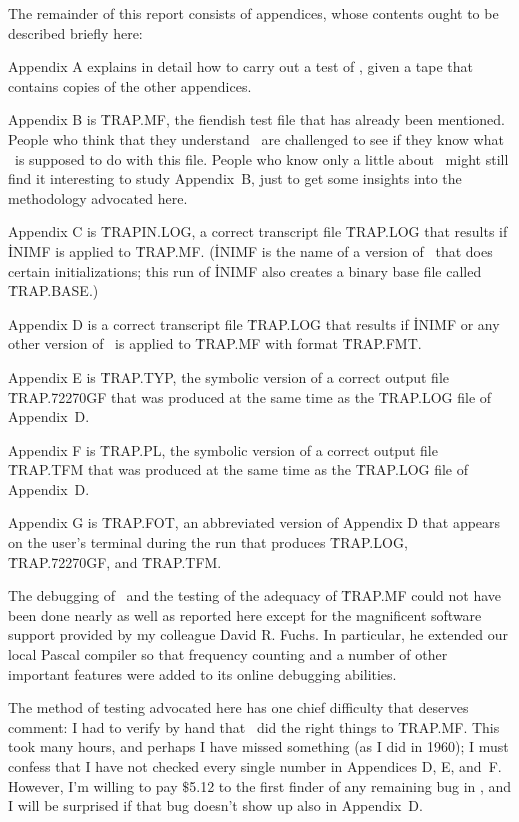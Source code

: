 The remainder of this report consists of appendices, whose contents ought
to be described briefly here:

Appendix A explains in detail how to carry out a test of \MF, given
a tape that contains copies of the other appendices.

Appendix B is \.{TRAP.MF}, the fiendish test file that has already
been mentioned. People who think that they understand \MF\ are challenged
to see if they know what \MF\ is supposed to do with this file.
People who know only a little about \MF\ might still find it
interesting to study Appendix~B, just to get some insights into the
methodology advocated here.

Appendix C is \.{TRAPIN.LOG}, a correct transcript file \.{TRAP.LOG}
that results if \.{INIMF} is applied to \.{TRAP.MF}. (\.{INIMF} is
the name of a version of \MF\ that does certain initializations;
this run of \.{INIMF} also creates a binary base file called \.{TRAP.BASE}.)

Appendix D is a correct transcript file \.{TRAP.LOG} that results if
\.{INIMF} or any other version of \MF\ is applied to \.{TRAP.MF}
with format \.{TRAP.FMT}.

Appendix E is \.{TRAP.TYP}, the symbolic version of a correct output
file \.{TRAP.72270GF} that was produced at the same time as the \.{TRAP.LOG}
file of Appendix~D.

Appendix F is \.{TRAP.PL}, the symbolic version of a correct output
file \.{TRAP.TFM} that was produced at the same time as the \.{TRAP.LOG}
file of Appendix~D.

Appendix G is \.{TRAP.FOT}, an abbreviated version of Appendix D that
appears on the user's terminal during the run that produces \.{TRAP.LOG},
\.{TRAP.72270GF}, and \.{TRAP.TFM}.

The debugging of \MF\ and the testing of the adequacy of \.{TRAP.MF}
could not have been done nearly as well as reported here except for
the magnificent software support provided by my colleague David R. Fuchs.
In particular, he extended our local Pascal compiler so that
frequency counting and a number of other important features were added
to its online debugging abilities.

The method of testing advocated here has one chief difficulty that deserves
comment: I had to verify by hand that \MF\ did the right things
to \.{TRAP.MF}. This took many hours, and perhaps I have missed
something (as I did in 1960); I must confess that I have not checked
every single number in Appendices D, E, and~F. However, I'm willing to pay
$\$$5.12 to the first finder of any remaining bug in \MF, and I will
be surprised if that bug doesn't show up also in Appendix~D.

